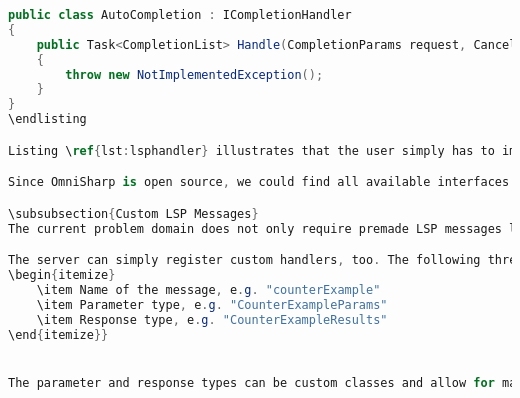 \begin{lstlisting}[language=csharp, caption={LSP Handler Implementation}, captionpos=b, label={lst:lsphandler}]
public class AutoCompletion : ICompletionHandler
{
    public Task<CompletionList> Handle(CompletionParams request, CancellationToken cancellationToken)
    {
        throw new NotImplementedException();
    }
}
\endlisting

Listing \ref{lst:lsphandler} illustrates that the user simply has to implement an interface provided by Omnisharp. Within the \code{request} parameter, all required information is passed to the handler. For auto completion, this is the file and the cursor position and some context information, how the auto completion event was triggered. The task of the langauge server is now to figure proper suggestions and return them in the form of a \code{CompletionList}.\\

Since OmniSharp is open source, we could find all available interfaces and thus all available handlers in their git repository \cite{omnisharpgit}. This collection is very helpful to perceive LSP's possibilities.

\subsubsection{Custom LSP Messages}
The current problem domain does not only require premade LSP messages like auto completions or diagnostics, but also custom requests such as \code{counterexample}, which is Dafny-specific. Such a message is not natively supported by the language server protocol. Since no example or documentation could be found on custom messages, Martin Bj\"orkstr\"om was contacted in the OmniSharp Slack channel \cite{omnisharpslack}. Mr. Bj\"orkstr\"om and his team were able to provide the solution for this issue.\\

The server can simply register custom handlers, too. The following three items have to be specified:
\begin{itemize}
    \item Name of the message, e.g. "counterExample"
    \item Parameter type, e.g. "CounterExampleParams"
    \item Response type, e.g. "CounterExampleResults"
\end{itemize}}


The parameter and response types can be custom classes and allow for maximal flexibility. The following code skeleton demonstrates how a custom request handler can be implemented:


\end{lstlisting}

